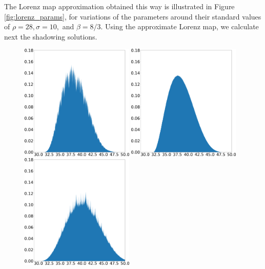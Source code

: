 The Lorenz map approximation obtained this way is illustrated in Figure \ref{fig:lorenz_params}, for variations of the parameters around their standard values of 
$\rho = 28, \sigma = 10,$ and $\beta = 8/3.$ Using the approximate Lorenz map, we calculate next the shadowing solutions. 
\begin{figure}
    \centering
    \includegraphics[width=0.48\textwidth]{lorenz_shadow_density_lorenz_zmax_15_28_2.67.json.png}
    \hspace{0.005\textwidth}
    \includegraphics[width=0.48\textwidth]{baseline_density_lorenz_zmax_15_28_2.67.json.png}
    \\
    \includegraphics[width=0.48\textwidth]{lorenz_shadow_density_lorenz_zmax_10_30_2.67.json.png}

\end{figure}
